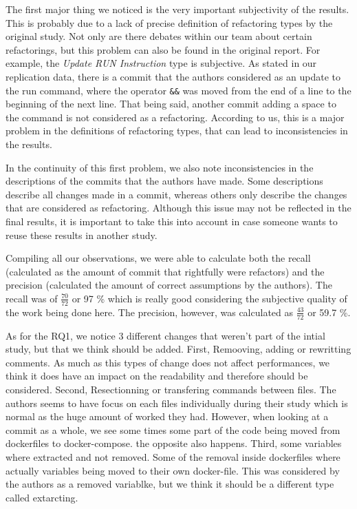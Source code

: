\documentclass[lettersize,journal]{IEEEtran}
\begin{document}
The first major thing we noticed is the very important subjectivity of the results.
This is probably due to a lack of precise definition of refactoring types by the original study.
Not only are there debates within our team about certain refactorings, but this problem can also be found in the original report.
For example, the \textit{Update RUN Instruction} type is subjective.
As stated in our replication data, there is a commit that the authors considered as an update to the run command, where the operator \texttt{\&\&} was moved from the end of a line to the beginning of the next line.
That being said, another commit adding a space to the command is not considered as a refactoring.
According to us, this is a major problem in the definitions of refactoring types, that can lead to inconsistencies in the results.

In the continuity of this first problem, we also note inconsistencies in the descriptions of the commits that the authors have made.
Some descriptions describe all changes made in a commit, whereas others only describe the changes that are considered as refactoring.
Although this issue may not be reflected in the final results, it is important to take this into account in case someone wants to reuse these results in another study.

Compiling all our observations, we were able to calculate both the recall (calculated as the amount of commit that rightfully were refactors) and the precision (calculated the amount of correct assumptions by the authors). 
The recall was of $\frac{70}{72}$ or  97 \% which is really good considering the subjective quality of the work being done here. 
The precision, however, was calculated as $\frac{43}{72}$ or 59.7 \%.

As for the RQ1, we notice 3 different changes that weren't part of the intial study, but that we think should be added.
First, Remooving, adding or rewritting comments. 
As much as this types of change does not affect performances, we think it does have an impact on the readability and therefore should be considered.
Second, Resectionning or transfering commands between files. 
The authors seems to have focus on each files individually during their study which is normal as the huge amount of worked they had.
However, when looking at a commit as a whole, we see some times some part of the code being moved from dockerfiles to docker-compose. the opposite also happens.
Third, some variables where extracted and not removed.  
Some of the removal inside dockerfiles where actually variables being moved to their own docker-file. 
This was considered by the authors as a removed variablke, but we think it should be a different type called extarcting.
\end{document}
